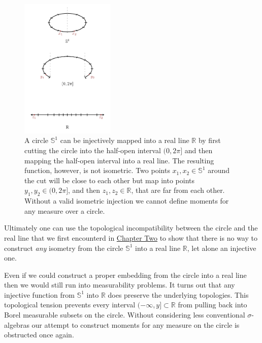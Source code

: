 \documentclass[
  letterpaper,
  DIV=11,
  numbers=noendperiod]{scrartcl}
\begin{document}
\begin{figure}

{\centering \includegraphics[width=0.4\textwidth,height=\textheight]{figures/embeddings/circle/circle.pdf}

}

\caption{\label{fig-no-circle-embedding}A circle \(\mathbb{S}^{1}\) can
be injectively mapped into a real line \(\mathbb{R}\) by first cutting
the circle into the half-open interval \((0, 2 \pi]\) and then mapping
the half-open interval into a real line. The resulting function,
however, is not isometric. Two points
\(x_{1}, x_{2} \in \mathbb{S}^{1}\) around the cut will be close to each
other but map into points \(y_{1}, y_{2} \in (0, 2 \pi]\), and then
\(z_{1}, z_{2} \in \mathbb{R}\), that are far from each other. Without a
valid isometric injection we cannot define moments for any measure over
a circle.}

\end{figure}

Ultimately one can use the topological incompatibility between the
circle and the real line that we first encounterd in
\href{https://betanalpha.github.io/assets/chapters_html/spaces.html}{Chapter
Two} to show that there is no way to construct \emph{any} isometry from
the circle \(\mathbb{S}^{1}\) into a real line \(\mathbb{R}\), let alone
an injective one.

Even if we could construct a proper embedding from the circle into a
real line then we would still run into measurability problems. It turns
out that any injective function from \(\mathbb{S}^{1}\) into
\(\mathbb{R}\) does preserve the underlying topologies. This topological
tension prevents every interval \((-\infty, y] \subset \mathbb{R}\) from
pulling back into Borel measurable subsets on the circle. Without
considering less conventional \(\sigma\)-algebras our attempt to
construct moments for any measure on the circle is obstructed once
again.
\end{document}
